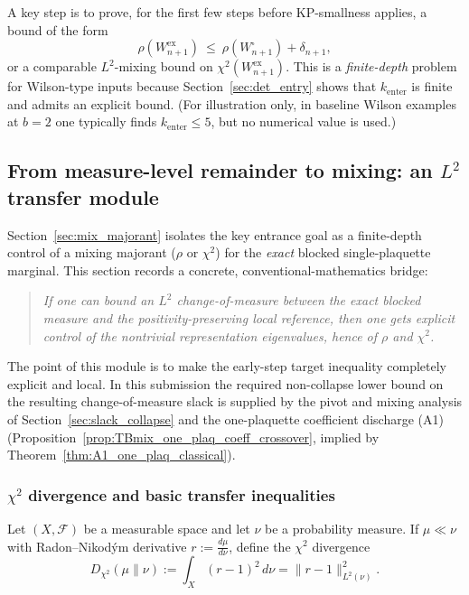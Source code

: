 \begin{remark}
A key step is to prove, for the first few steps before KP-smallness applies, a bound of the form
\[
\rho(W_{n+1}^{\mathrm{ex}})\ \le\ \rho(W_{n+1}^{\square}) + \delta_{n+1},
\]
or a comparable $L^2$-mixing bound on $\chi^2(W_{n+1}^{\mathrm{ex}})$.
This is a \emph{finite-depth} problem for Wilson-type inputs because
Section~\ref{sec:det_entry} shows that $k_{\mathrm{enter}}$ is finite and admits an explicit bound.
(For illustration only, in baseline Wilson examples at $b=2$ one typically finds $k_{\mathrm{enter}}\le 5$, but no numerical value is used.)
\end{remark}




\subsection{From measure-level remainder to mixing: an \texorpdfstring{$L^2$}{L2} transfer module}\label{sec:L2_transfer}

Section~\ref{sec:mix_majorant} isolates the key entrance goal as a finite-depth control of a
mixing majorant ($\rho$ or $\chi^2$) for the \emph{exact} blocked single-plaquette marginal.
This section records a concrete, conventional-mathematics bridge:
\begin{quote}
\emph{If one can bound an $L^2$ change-of-measure between the exact blocked measure and the
positivity-preserving local reference, then one gets explicit control of the nontrivial
representation eigenvalues, hence of $\rho$ and $\chi^2$.}
\end{quote}

The point of this module is to make the early-step target inequality completely explicit and local.
In this submission the required non-collapse lower bound on the resulting change-of-measure slack is supplied by the
pivot and mixing analysis of Section~\ref{sec:slack_collapse} and the one-plaquette coefficient discharge (A1)
(Proposition~\ref{prop:TBmix_one_plaq_coeff_crossover}, implied by Theorem~\ref{thm:A1_one_plaq_classical}).

\subsubsection{\texorpdfstring{$\chi^2$}{chi2} divergence and basic transfer inequalities}

Let $(X,\mathcal F)$ be a measurable space and let $\nu$ be a probability measure.
If $\mu\ll\nu$ with Radon--Nikod\'ym derivative $r:=\frac{d\mu}{d\nu}$, define the $\chi^2$ divergence
\begin{equation}\label{eq:chi2_div}
D_{\chi^2}(\mu\|\nu):=\int_X (r-1)^2\,d\nu=\|r-1\|_{L^2(\nu)}^2.
\end{equation}

